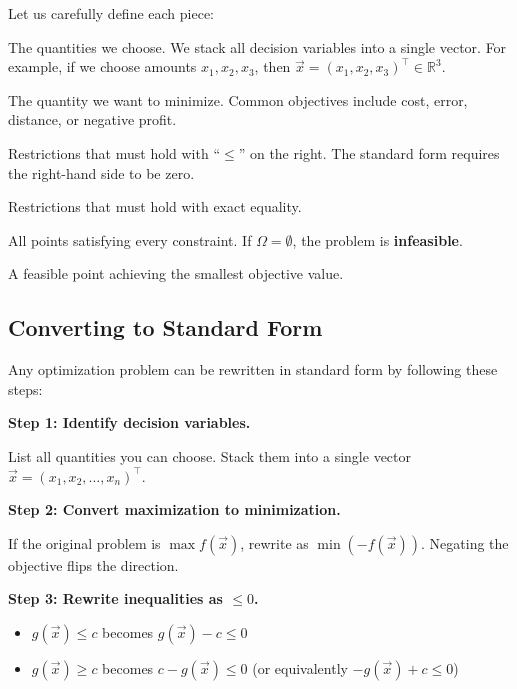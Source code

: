 \documentclass[10pt, twocolumn]{article}
\theoremstyle{definition}
\theoremstyle{plain}
\newcommand{\RR}{\mathbb{R}}
\begin{document}
Let us carefully define each piece:

\begin{description}[style=nextline]
    \item[Decision variable $\vec{x} \in \RR^n$] The quantities we choose. We stack all decision variables into a single vector. For example, if we choose amounts $x_1, x_2, x_3$, then $\vec{x} = (x_1, x_2, x_3)^\top \in \RR^3$.
    \item[Objective function $f_0: \RR^n \to \RR$] The quantity we want to minimize. Common objectives include cost, error, distance, or negative profit.
    \item[Inequality constraints $f_i(\vec{x}) \le 0$] Restrictions that must hold with ``$\le$'' on the right. The standard form requires the right-hand side to be zero.
    \item[Equality constraints $h_j(\vec{x}) = 0$] Restrictions that must hold with exact equality.
    \item[Feasible set $\Omega$] All points satisfying every constraint. If $\Omega = \emptyset$, the problem is \textbf{infeasible}.
    \item[Solution $\vec{x}^\star$] A feasible point achieving the smallest objective value.
\end{description}

\subsection{Converting to Standard Form}

Any optimization problem can be rewritten in standard form by following these steps:

\textbf{Step 1: Identify decision variables.}

List all quantities you can choose. Stack them into a single vector $\vec{x} = (x_1, x_2, \ldots, x_n)^\top$.

\textbf{Step 2: Convert maximization to minimization.}

If the original problem is $\max f(\vec{x})$, rewrite as $\min (-f(\vec{x}))$. Negating the objective flips the direction.

\textbf{Step 3: Rewrite inequalities as $\le 0$.}

\begin{itemize}
    \item $g(\vec{x}) \le c$ becomes $g(\vec{x}) - c \le 0$
    \item $g(\vec{x}) \ge c$ becomes $c - g(\vec{x}) \le 0$ (or equivalently $-g(\vec{x}) + c \le 0$)
\end{itemize}
\end{document}
